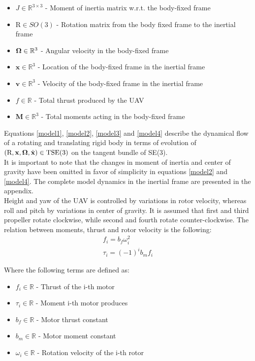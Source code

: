 \begin{itemize}
	\item $J \in \mathbb{R}^{3 \times 3}$ - Moment of inertia matrix w.r.t. the body-fixed frame
	
	\item $\text{R} \in SO(3)$ - Rotation matrix from the body fixed frame to the inertial frame
	
	\item $\boldsymbol{\Omega} \in \mathbb{R}^3$ - Angular velocity in the body-fixed frame
	
	\item $\textbf{x} \in \mathbb{R}^3$ - Location of the body-fixed frame in the inertial frame
	
	\item $\textbf{v} \in \mathbb{R}^3$ - Velocity of the body-fixed frame in the inertial frame
	
	\item $f \in \mathbb{R}$ - Total thrust produced by the UAV
	
	\item $\textbf{M} \in \mathbb{R}^3$ - Total moments acting in the body-fixed frame
\end{itemize}
\indent Equations \ref{model1}, \ref{model2}, \ref{model3} and \ref{model4} describe the dynamical flow of a rotating and translating rigid body in terms of evolution of $(\text{R},\textbf{x},\boldsymbol{\Omega},\dot{\textbf{x}})\in \text{TSE}(3)$ on the tangent bundle of SE(3). \\
It is important to note that the changes in moment of inertia and center of gravity have been omitted in favor of simplicity in equations \ref{model2} and \ref{model4}. The complete model dynamics in the inertial frame are presented in the appendix.\\
\indent Height and yaw of the UAV is controlled by variations in rotor velocity, whereas roll and pitch by variations in center of gravity. It is assumed that first and third propeller rotate clockwise, while second and fourth rotate counter-clockwise. The relation between moments, thrust and rotor velocity is the following:
\begin{gather}
	f_i = b_f \omega_{i}^2 \label{force}\\
	\tau_i = (-1)^i b_m f_i
\end{gather}

\noindent Where the following terms are defined as:

\begin{itemize}
	\item $f_i \in \mathbb{R}$ - Thrust of the i-th motor
	
	\item $\tau_i \in \mathbb{R}$ - Moment i-th motor produces
	
	\item $b_f \in \mathbb{R}$ - Motor thrust constant
	
	\item $b_m \in \mathbb{R}$ - Motor moment constant
	
	\item $\omega_i \in \mathbb{R}$ - Rotation velocity of the i-th rotor
\end{itemize}

